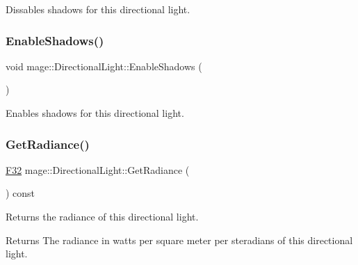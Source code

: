 Dissables shadows for this directional light. \hypertarget{classmage_1_1_directional_light_a36436d5d99ccf6a0e49e81f26c3f9bc7}{}\label{classmage_1_1_directional_light_a36436d5d99ccf6a0e49e81f26c3f9bc7} 
\subsubsection{\texorpdfstring{Enable\+Shadows()}{EnableShadows()}}
{\footnotesize\ttfamily void mage\+::\+Directional\+Light\+::\+Enable\+Shadows (\begin{DoxyParamCaption}{ }\end{DoxyParamCaption})\hspace{0.3cm}{\ttfamily [noexcept]}}

Enables shadows for this directional light. \hypertarget{classmage_1_1_directional_light_a73fe73ce8184bf32379ead1e00b34c9f}{}\label{classmage_1_1_directional_light_a73fe73ce8184bf32379ead1e00b34c9f} 
\subsubsection{\texorpdfstring{Get\+Radiance()}{GetRadiance()}}
{\footnotesize\ttfamily \hyperlink{namespacemage_aa97e833b45f06d60a0a9c4fc22ae02c0}{F32} mage\+::\+Directional\+Light\+::\+Get\+Radiance (\begin{DoxyParamCaption}{ }\end{DoxyParamCaption}) const\hspace{0.3cm}{\ttfamily [noexcept]}}

Returns the radiance of this directional light.

\begin{DoxyReturn}{Returns}
The radiance in watts per square meter per steradians of this directional light. 
\end{DoxyReturn}
\hypertarget{classmage_1_1_directional_light_a137cef14d20df2c907884a04ae2019ff}{}\label{classmage_1_1_directional_light_a137cef14d20df2c907884a04ae2019ff} 
